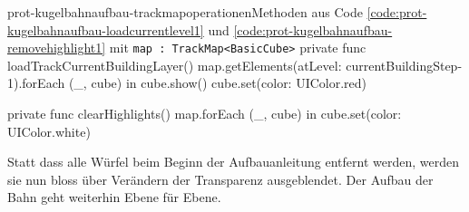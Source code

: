 \begin{description}
	\begin{code}{prot-kugelbahnaufbau-trackmapoperationen}{Methoden aus Code \ref{code:prot-kugelbahnaufbau-loadcurrentlevel1} und \ref{code:prot-kugelbahnaufbau-removehighlight1} mit \texttt{map : TrackMap<BasicCube>}}
		private func loadTrackCurrentBuildingLayer() {
			map.getElements(atLevel: currentBuildingStep-1).forEach { (_, cube) in
				cube.show()
				cube.set(color: UIColor.red)
			}
		}

		private func clearHighlights() {
			map.forEach { (_, cube) in
				cube.set(color: UIColor.white)
			}
		}
	\end{code}

	Statt dass alle Würfel beim Beginn der Aufbauanleitung entfernt werden, werden sie nun bloss über Verändern der Transparenz ausgeblendet. Der Aufbau der Bahn geht weiterhin Ebene für Ebene.


\end{description}


